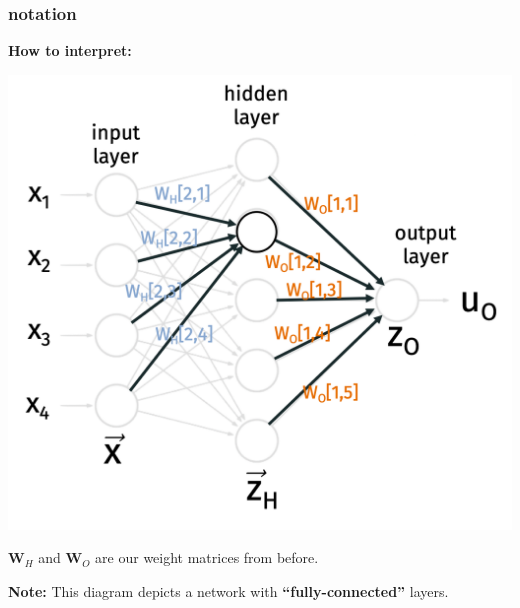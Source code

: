 \documentclass[handout,compress]{beamer}
\newcommand{\bv}[1]{\mathbf{#1}}
\begin{document}
\begin{frame}
	\frametitle{notation}
	\textbf{How to interpret:}
	\vspace{-1em}
	\begin{center}
		\includegraphics[width=.6\textwidth]{weights2.png}
	\end{center}
\vspace{-1.5em}
$\bv{W}_H$ and $\bv{W}_O$ are our weight matrices from before. 

\textbf{Note:} This diagram depicts a network with \textbf{``fully-connected''} layers.
\end{frame}
\end{document}
